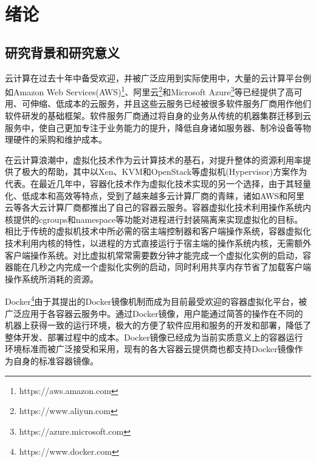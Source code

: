 
\chapter{绪论}
\label{chap:intro}

\section{研究背景和研究意义}
云计算在过去十年中备受欢迎，并被广泛应用到实际使用中，大量的云计算平台例如Amazon Web Services(AWS)\footnote{https://aws.amazon.com}、阿里云\footnote{https://www.aliyun.com}和Microsoft Azure\footnote{https://azure.microsoft.com}等已经提供了高可用、可伸缩、低成本的云服务，并且这些云服务已经被很多软件服务厂商用作他们软件研发的基础框架。软件服务厂商通过将自身的业务从传统的机器集群迁移到云服务中，使自己更加专注于业务能力的提升，降低自身诸如服务器、制冷设备等物理硬件的采购和维护成本。

在云计算浪潮中，虚拟化技术作为云计算技术的基石\cite{zhang2010cloud}，对提升整体的资源利用率提供了极大的帮助，其中以Xen\cite{barham2003xen}、KVM\cite{kivity2007kvm}和OpenStack\cite{sefraoui2012openstack}等虚拟机(Hypervisor)\cite{buyya2010cloud}方案作为代表。在最近几年中，容器化技术作为虚拟化技术实现的另一个选择，由于其轻量化、低成本和高效等特点\cite{soltesz2007container}，受到了越来越多云计算厂商的青睐，诸如AWS和阿里云等各大云计算厂商都推出了自己的容器云服务。容器虚拟化技术利用操作系统内核提供的cgroups和namespace等功能对进程进行封装隔离来实现虚拟化的目标。相比于传统的虚拟机技术中所必需的宿主端控制器和客户端操作系统，容器虚拟化技术利用内核的特性，以进程的方式直接运行于宿主端的操作系统内核，无需额外客户端操作系统。对比虚拟机常常需要数分钟才能完成一个虚拟化实例的启动，容器能在几秒之内完成一个虚拟化实例的启动，同时利用共享内存节省了加载客户端操作系统所消耗的资源。

Docker\footnote{https://www.docker.com}由于其提出的Docker镜像机制而成为目前最受欢迎的容器虚拟化平台\cite{merkel2014docker}，被广泛应用于各容器云服务中。通过Docker镜像，用户能通过简答的操作在不同的机器上获得一致的运行环境，极大的方便了软件应用和服务的开发和部署，降低了整体开发、部署过程中的成本。Docker镜像已经成为当前实质意义上的容器运行环境标准而被广泛接受和采用，现有的各大容器云提供商也都支持Docker镜像作为自身的标准容器镜像。

